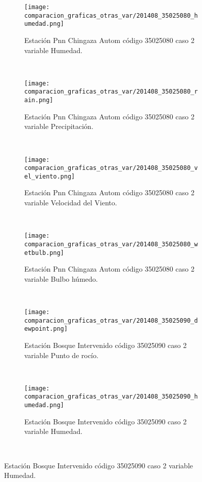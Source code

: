 \begin{figure}[H]
\centering
\begin{subfigure}[normla]{0.4\textwidth}
\caption{Estación Pnn Chingaza Autom  código 35025080 caso 2 variable Humedad.}
\texttt{[image: comparacion\_graficas\_otras\_var/201408\_35025080\_humedad.png]}
\end{subfigure}
~
\begin{subfigure}[normla]{0.4\textwidth}
\caption{Estación Pnn Chingaza Autom  código 35025080 caso 2 variable Precipitación.}
\texttt{[image: comparacion\_graficas\_otras\_var/201408\_35025080\_rain.png]}
\end{subfigure}
~
\begin{subfigure}[normla]{0.4\textwidth}
\caption{Estación Pnn Chingaza Autom  código 35025080 caso 2 variable Velocidad del Viento.}
\texttt{[image: comparacion\_graficas\_otras\_var/201408\_35025080\_vel\_viento.png]}
\end{subfigure}
~
\begin{subfigure}[normla]{0.4\textwidth}
\caption{Estación Pnn Chingaza Autom  código 35025080 caso 2 variable Bulbo húmedo.}
\texttt{[image: comparacion\_graficas\_otras\_var/201408\_35025080\_wetbulb.png]}
\end{subfigure}
~
\begin{subfigure}[normla]{0.4\textwidth}
\caption{Estación Bosque Intervenido   código 35025090 caso 2 variable Punto de rocío.}
\texttt{[image: comparacion\_graficas\_otras\_var/201408\_35025090\_dewpoint.png]}
\end{subfigure}
~
\begin{subfigure}[normla]{0.4\textwidth}
\caption{Estación Bosque Intervenido   código 35025090 caso 2 variable Humedad.}
\texttt{[image: comparacion\_graficas\_otras\_var/201408\_35025090\_humedad.png]}
\end{subfigure}
~
\end{figure}
           
